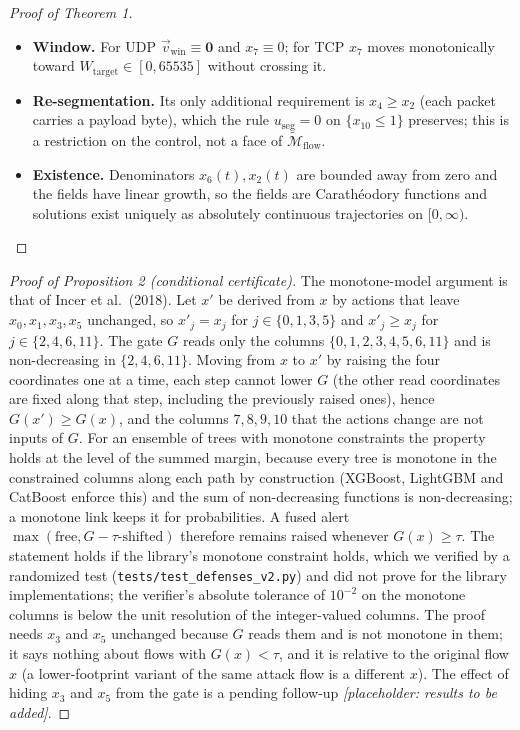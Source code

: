 \begin{proof}[Proof of Theorem 1]
\begin{itemize}
    \item \textbf{Window.} For UDP $\vec v_{\text{win}}\equiv\mathbf0$ and $x_7\equiv0$; for TCP $x_7$ moves monotonically toward $W_{\text{target}}\in[0,65535]$ without crossing it.
    \item \textbf{Re-segmentation.} Its only additional requirement is $x_4\ge x_2$ (each packet carries a payload byte), which the rule $u_{\text{seg}}=0$ on $\{x_{10}\le1\}$ preserves; this is a restriction on the control, not a face of $\widetilde{\mathcal M}_{\text{flow}}$.
    \item \textbf{Existence.} Denominators $x_6(t),x_2(t)$ are bounded away from zero and the fields have linear growth, so the fields are Carath\'eodory functions and solutions exist uniquely as absolutely continuous trajectories on $[0,\infty)$.
\end{itemize}
\end{proof}

\begin{proof}[Proof of Proposition 2 (conditional certificate)]
The monotone-model argument is that of Incer et al.\ (2018). Let $x'$ be derived from $x$ by actions that leave $x_0,x_1,x_3,x_5$ unchanged, so $x'_j=x_j$ for $j\in\{0,1,3,5\}$ and $x'_j\ge x_j$ for $j\in\{2,4,6,11\}$. The gate $G$ reads only the columns $\{0,1,2,3,4,5,6,11\}$ and is non-decreasing in $\{2,4,6,11\}$. Moving from $x$ to $x'$ by raising the four coordinates one at a time, each step cannot lower $G$ (the other read coordinates are fixed along that step, including the previously raised ones), hence $G(x')\ge G(x)$, and the columns $7,8,9,10$ that the actions change are not inputs of $G$. For an ensemble of trees with monotone constraints the property holds at the level of the summed margin, because every tree is monotone in the constrained columns along each path by construction (XGBoost, LightGBM and CatBoost enforce this) and the sum of non-decreasing functions is non-decreasing; a monotone link keeps it for probabilities. A fused alert $\max(\text{free},G-\tau\text{-shifted})$ therefore remains raised whenever $G(x)\ge\tau$. The statement holds if the library's monotone constraint holds, which we verified by a randomized test (\texttt{tests/test\_defenses\_v2.py}) and did not prove for the library implementations; the verifier's absolute tolerance of $10^{-2}$ on the monotone columns is below the unit resolution of the integer-valued columns. The proof needs $x_3$ and $x_5$ unchanged because $G$ reads them and is not monotone in them; it says nothing about flows with $G(x)<\tau$, and it is relative to the original flow $x$ (a lower-footprint variant of the same attack flow is a different $x$). The effect of hiding $x_3$ and $x_5$ from the gate is a pending follow-up \emph{[placeholder: results to be added]}.
\end{proof}


